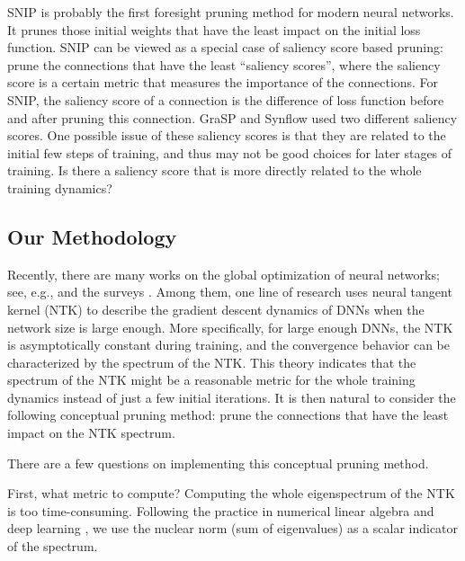 \documentclass{article} %
\begin{document}
SNIP \citep{snip} is probably the first foresight pruning method for modern neural networks. It prunes those initial weights that have the least impact on the initial loss function. SNIP can be viewed as a special case of saliency score based pruning: prune the connections that have the least ``saliency scores'', where the saliency score is a certain metric that measures the importance of the connections. For SNIP, the saliency score of a connection is the difference of loss function before and after pruning this connection. GraSP \citep{grasp} and Synflow \citep{synflow} used two different saliency scores. One possible issue of these saliency scores is that they are related to the initial few steps of training, and thus may not be good choices for later stages of training. Is there a saliency score that is more directly related to the whole training dynamics?

\subsection{Our Methodology}
Recently, there are many works on the global optimization of neural networks; see, e.g.,
\cite{liang2018understanding,liang2018adding,liang2019revisiting,liang2021ReLU,venturi2018spurious, safran2017spurious, li2022benefit, ding2022suboptimal,soltanolkotabi2019theoretical,sun2020GAN, lin2021faster,lin2021landscape, zhang2021expressivity} and the surveys \cite{sun2020global,sun2020optimization}. Among them, one line of research uses neural tangent kernel (NTK) \citep{jacot2018ntk} to describe the gradient descent dynamics of DNNs when the network size is large enough. More specifically, for large enough DNNs, the NTK is asymptotically constant during training, and the convergence behavior can be characterized by the spectrum of the NTK. This theory indicates that the spectrum of the NTK might be a reasonable metric for the whole training dynamics instead of just a few initial iterations. It is then natural to consider the following conceptual pruning method: prune the connections that have the least impact on the NTK spectrum. 
 
There are a few questions on implementing this conceptual pruning method.

First, what metric to compute? Computing the whole eigenspectrum of the NTK is too time-consuming. Following the practice in numerical linear algebra and deep learning \citep{lee2019wide,xiao2020disentangling}, we use the nuclear norm (sum of eigenvalues) as a scalar indicator of the spectrum. 
\end{document}
